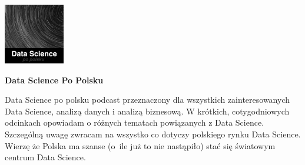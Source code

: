 \documentclass[\main/boa.tex]{subfiles}
\begin{document}
	
	\begin{minipage}[t]{0.915\textwidth}
		\center     
		\includegraphics[width=100px]{img/logos.bw/DataScience.png} 
	\end{minipage}
	\begin{center}
	\Large \textbf {Data Science Po Polsku}
	\end{center}
	
	\vskip 0.3cm
	\normalsize 
	Data Science po polsku podcast przeznaczony dla wszystkich zainteresowanych Data Science, analizą danych i analizą biznesową. W krótkich, cotygodniowych odcinkach opowiadam o różnych tematach powiązanych z Data Science. Szczególną uwagę zwracam na wszystko co dotyczy polskiego rynku Data Science. Wierzę że Polska ma szanse (o~ile już to nie nastąpiło) stać się światowym centrum Data Science.
	
	\vskip 1.5cm
\end{document}
